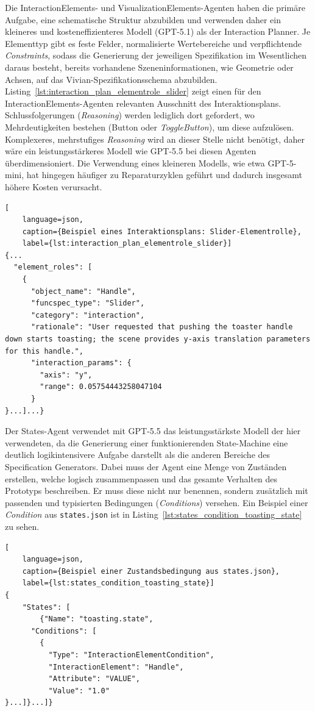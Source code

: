 Die InteractionElements- und VisualizationElements-Agenten haben die primäre Aufgabe, eine schematische Struktur abzubilden und verwenden daher ein kleineres und kosteneffizienteres Modell (GPT-5.1) als der Interaction Planner. Je Elementtyp gibt es feste Felder, normalisierte Wertebereiche und verpflichtende \textit{Constraints}, sodass die Generierung der jeweiligen Spezifikation im Wesentlichen daraus besteht, bereits vorhandene Szeneninformationen, wie Geometrie oder Achsen, auf das Vivian-Spezifikationsschema abzubilden. Listing~\ref{lst:interaction_plan_elementrole_slider} zeigt einen für den InteractionElements-Agenten relevanten Ausschnitt des Interaktionsplans. Schlussfolgerungen (\textit{Reasoning}) werden lediglich dort gefordert, wo Mehrdeutigkeiten bestehen (\zB Button oder \textit{ToggleButton}), um diese aufzulösen. Komplexeres, mehrstufiges \textit{Reasoning} wird an dieser Stelle nicht benötigt, daher wäre ein leistungsstärkeres Modell wie GPT-5.5 bei diesen Agenten überdimensioniert. Die Verwendung eines kleineren Modells, wie etwa GPT-5-mini, hat hingegen häufiger zu Reparaturzyklen geführt und dadurch insgesamt höhere Kosten verursacht.

\pagebreak
\begin{lstlisting}[
	language=json,
	caption={Beispiel eines Interaktionsplans: Slider-Elementrolle},
	label={lst:interaction_plan_elementrole_slider}]
{...
  "element_roles": [
    {
      "object_name": "Handle",
      "funcspec_type": "Slider",
      "category": "interaction",
      "rationale": "User requested that pushing the toaster handle down starts toasting; the scene provides y-axis translation parameters for this handle.",
      "interaction_params": {
        "axis": "y",
        "range": 0.05754443258047104
      }
}...]...}
\end{lstlisting}

Der States-Agent verwendet mit GPT-5.5 das leistungsstärkste Modell der hier verwendeten, da die Generierung einer funktionierenden State-Machine eine deutlich logikintensivere Aufgabe darstellt als die anderen Bereiche des Specification Generators. Dabei muss der Agent eine Menge von Zuständen erstellen, welche logisch zusammenpassen und das gesamte Verhalten des Prototyps beschreiben. Er muss diese nicht nur benennen, sondern zusätzlich mit passenden und typisierten Bedingungen (\textit{Conditions}) versehen. Ein Beispiel einer \textit{Condition} aus \texttt{states.json} ist in Listing~\ref{lst:states_condition_toasting_state} zu sehen.

\begin{lstlisting}[
	language=json,
	caption={Beispiel einer Zustandsbedingung aus states.json},
	label={lst:states_condition_toasting_state}]
{ 
	"States": [
		{"Name": "toasting.state",
      "Conditions": [
        {
          "Type": "InteractionElementCondition",
          "InteractionElement": "Handle",
          "Attribute": "VALUE",
          "Value": "1.0"		
}...]}...]}
\end{lstlisting}

